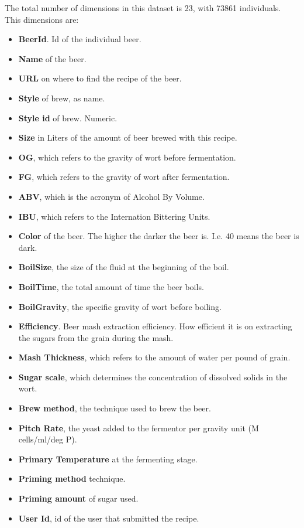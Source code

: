 The total number of dimensions in this dataset is 23, with 73861 individuals. This dimensions are:
\begin{itemize}
  \item \textbf{BeerId}. Id of the individual beer.
  \item \textbf{Name} of the beer.
  \item \textbf{URL} on where to find the recipe of the beer.
  \item \textbf{Style} of brew, as name.
  \item \textbf{Style id} of brew. Numeric.
  \item \textbf{Size} in Liters of the amount of beer brewed with this recipe.
  \item \textbf{OG}, which refers to the gravity of wort before fermentation.
  \item \textbf{FG}, which refers to the gravity of wort after fermentation.
  \item \textbf{ABV}, which is the acronym of Alcohol By Volume.
  \item \textbf{IBU}, which refers to the Internation Bittering Units.
  \item \textbf{Color} of the beer. The higher the darker the beer is. I.e. 40 means the beer is dark.
  \item \textbf{BoilSize}, the size of the fluid at the beginning of the boil.
  \item \textbf{BoilTime}, the total amount of time the beer boils.
  \item \textbf{BoilGravity}, the specific gravity of wort before boiling.
  \item \textbf{Efficiency}. Beer mash extraction efficiency. How efficient it is on extracting the sugars from the grain during the mash.
  \item \textbf{Mash Thickness}, which refers to the amount of water per pound of grain.
  \item \textbf{Sugar scale}, which determines the concentration of dissolved solids in the wort.
  \item \textbf{Brew method}, the technique used to brew the beer.
  \item \textbf{Pitch Rate}, the yeast added to the fermentor per gravity unit (M cells/ml/deg P).
  \item \textbf{Primary Temperature} at the fermenting stage.
  \item \textbf{Priming method} technique.
  \item \textbf{Priming amount} of sugar used.
  \item \textbf{User Id}, id of the user that submitted the recipe.
\end{itemize}




